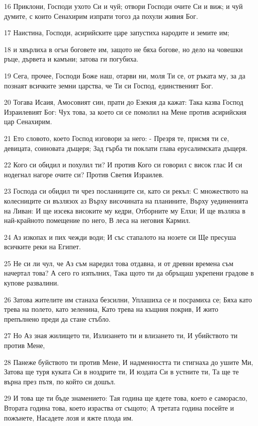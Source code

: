 \par 16 Приклони, Господи ухото Си и чуй; отвори Господи очите Си и виж; и чуй думите, с които Сенахирим изпрати тогоз да похули живия Бог.
\par 17 Наистина, Господи, асирийските царе запустиха народите и земите им;
\par 18 и хвърлиха в огън боговете им, защото не бяха богове, но дело на човешки ръце, дървета и камъни; затова ги погубиха.
\par 19 Сега, прочее, Господи Боже наш, отарви ни, моля Ти се, от ръката му, за да познаят всичките земни царства, че Ти си Господ, единственият Бог.
\par 20 Тогава Исаия, Амосовият син, прати до Езекия да кажат: Така казва Господ Израилевият Бог: Чух това, за което си се помолил на Мене против асирийския цар Сенахирим.
\par 21 Ето словото, което Господ изговори за него: - Презря те, присмя ти се, девицата, соиновата дъщеря; Зад гърба ти поклати глава ерусалимската дъщеря.
\par 22 Кого си обидил и похулил ти? И против Кого си говорил с висок глас И си нодегнал нагоре очите си? Против Светия Израилев.
\par 23 Господа си обидил ти чрез посланиците си, като си рекъл: С множеството на колесниците си възлязох аз Върху височината на планините, Върху уединенията на Ливан: И ще изсека високите му кедри, Отборните му Елхи; И ще възляза в най-крайното помещение по него, В леса на неговия Кармил.
\par 24 Аз изкопах и пих чежди води; И със стапалото на нозете си Ще пресуша всичките реки на Египет.
\par 25 Не си ли чул, че Аз съм наредил това отдавна, и от древни времена съм начертал това? А сего го изпълних, Така щото ти да обръщаш укрепени градове в купове развалини.
\par 26 Затова жителите им станаха безсилни, Уплашиха се и посрамиха се; Бяха като трева на полето, като зеленина, Като трева на къщния покрив, И жито препълнено преди да стане стъбло.
\par 27 Но Аз зная жилището ти, Излизането ти и влизането ти, И убийството ти против Мене,
\par 28 Панеже буйството ти против Мене, И надменността ти стигнаха до ушите Ми, Затова ще туря куката Си в ноздрите ти, И юздата Си в устните ти, Та ще те върна през пътя, по който си дошъл.
\par 29 И това ще ти бъде знамението: Тая година ще ядете това, което е саморасло, Втората година това, което израства от същото; А третата година посейте и пожънете, Насадете лозя и яжте плода им.
